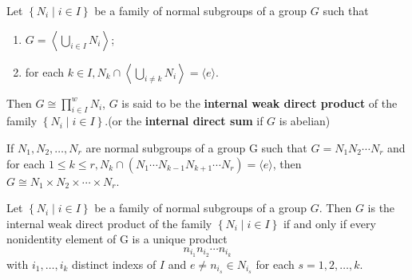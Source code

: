 \begin{theorem}
    Let $\left\{{N}_{i} \mid i \in {I}\right\}$ be a family of normal subgroups of a group $G$ such that
    \begin{enumerate}[label=(\roman*)]
        \item  $G=\left\langle\bigcup_{i \in I} {N}_{i}\right\rangle$;
        \item for each ${k} \in {I}, {N}_k \cap\left\langle\bigcup_{i \neq k} {N}_{i}\right\rangle=\langle{e}\rangle$.
    \end{enumerate}
    Then $G \cong \prod_{i \in I}^w {N}_{i}$, $G$ is said to be the \textbf{internal weak direct product} of the family $\left\{{N}_{i} \mid i \in {I}\right\}$.(or the \textbf{internal direct sum} if $G$ is abelian)
\end{theorem}


\begin{corollary}
    If ${N}_1, {N}_2, \ldots, {N}_{{r}}$ are normal subgroups of a group G such that $G={N}_1 {N}_2 \cdots {N}_{{r}}$ and for each $1 \leq {k} \leq {r}, {N}_k \cap\left({N}_1 \cdots {N}_{{k}-1} {N}_{{k}+1} \cdots {N}_{{r}}\right)=\langle{e}\rangle$, then $G \cong {N}_1 \times {N}_2 \times \cdots \times {N}_{{r}}$.
\end{corollary}

\begin{theorem}
    Let $\left\{N_{i} \mid i \in I\right\}$ be a family of normal subgroups of a group $G$. Then $G$ is the internal weak direct product of the family $\left\{N_{i} \mid i \in I\right\}$ if and only if every nonidentity element of G is a unique product
    \begin{equation*}
        n_{i_1} n_{i_2} \cdots n_{i_k}
    \end{equation*}
    with $i_1, \ldots, i_k$ distinct indexs of $I$ and $e \neq n_{i_s} \in N_{i_s}$ for each $s=1,2, \ldots, k$.
\end{theorem}



